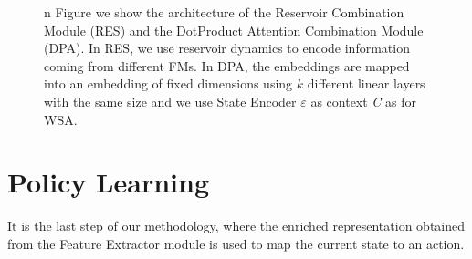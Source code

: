 \begin{figure}[ht]
    \caption{n Figure we show the architecture of the Reservoir Combination Module (RES) and the DotProduct Attention Combination Module (DPA). In RES, we use reservoir dynamics to encode information coming from different FMs. In DPA, the embeddings are mapped into an embedding of fixed dimensions using $k$ different linear layers with the same size and we use State Encoder $\varepsilon$ as context \textit{C} as for WSA.}
    \label{fig:dpa_combination}
\end{figure}



\section{Policy Learning}\label{sec:Policy Learning}
It is the last step of our methodology, where the enriched representation obtained from the Feature Extractor module is used to map the current state to an action.